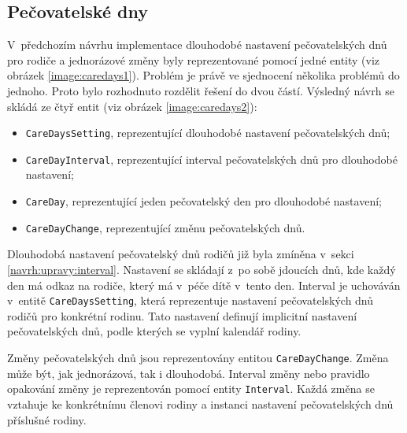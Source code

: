     \subsection{Pečovatelské dny}\label{navrh:upravy:caredays} %
        V~předchozím návrhu implementace dlouhodobé nastavení pečovatelských dnů pro rodiče a jednorázové změny byly reprezentované pomocí jedné entity (viz obrázek \ref{image:caredays1}). Problém je právě ve sjednocení několika problémů do jednoho. Proto bylo rozhodnuto rozdělit řešení do dvou částí. Výsledný návrh se skládá ze čtyř entit (viz obrázek \ref{image:caredays2}):
        \begin{itemize}
            \setlength\itemsep{0.3em}
            \item \texttt{CareDaysSetting}, reprezentující dlouhodobé nastavení pečovatelských dnů;
            \item \texttt{CareDayInterval}, reprezentující interval pečovatelských dnů pro dlouhodobé nastavení;
            \item \texttt{CareDay}, reprezentující jeden pečovatelský den pro dlouhodobé nastavení;
            \item \texttt{CareDayChange}, reprezentující změnu pečovatelských dnů.
        \end{itemize}
        Dlouhodobá nastavení pečovatelský dnů rodičů již byla zmíněna v~sekci \ref{navrh:upravy:interval}. Nastavení se skládají z~po sobě jdoucích dnů, kde každý den má odkaz na rodiče, který má v~péče dítě v~tento den. Interval je uchováván v~entitě \verb|CareDaysSetting|, která reprezentuje nastavení pečovatelských dnů rodičů pro konkrétní rodinu. Tato nastavení definují implicitní nastavení pečovatelských dnů, podle kterých se vyplní kalendář rodiny.
        
        Změny pečovatelských dnů jsou reprezentovány entitou \verb|CareDayChange|. Změna může být, jak jednorázová, tak i dlouhodobá. Interval změny nebo pravidlo opakování změny je reprezentován pomocí entity \verb|Interval|. Každá změna se vztahuje ke konkrétnímu členovi rodiny a instanci nastavení pečovatelských dnů příslušné rodiny.
        
